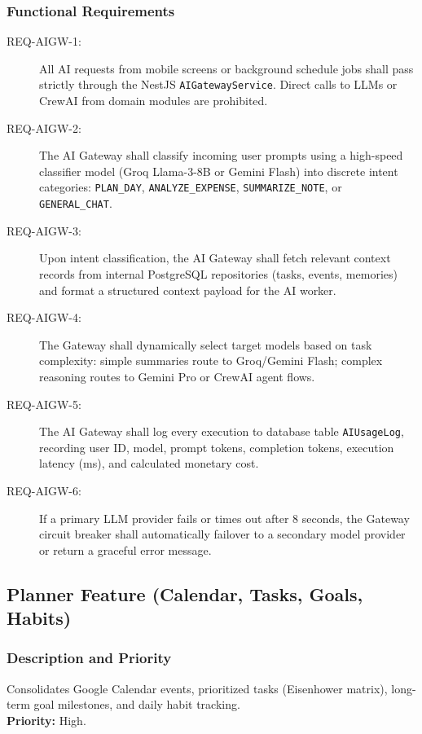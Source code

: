 \documentclass[11pt,a4paper]{article}
\begin{document}
\subsubsection{Functional Requirements}
\begin{description}
    \item[REQ-AIGW-1:] All AI requests from mobile screens or background schedule jobs shall pass strictly through the NestJS \texttt{AIGatewayService}. Direct calls to LLMs or CrewAI from domain modules are prohibited.
    \item[REQ-AIGW-2:] The AI Gateway shall classify incoming user prompts using a high-speed classifier model (Groq Llama-3-8B or Gemini Flash) into discrete intent categories: \texttt{PLAN\_DAY}, \texttt{ANALYZE\_EXPENSE}, \texttt{SUMMARIZE\_NOTE}, or \texttt{GENERAL\_CHAT}.
    \item[REQ-AIGW-3:] Upon intent classification, the AI Gateway shall fetch relevant context records from internal PostgreSQL repositories (tasks, events, memories) and format a structured context payload for the AI worker.
    \item[REQ-AIGW-4:] The Gateway shall dynamically select target models based on task complexity: simple summaries route to Groq/Gemini Flash; complex reasoning routes to Gemini Pro or CrewAI agent flows.
    \item[REQ-AIGW-5:] The AI Gateway shall log every execution to database table \texttt{AIUsageLog}, recording user ID, model, prompt tokens, completion tokens, execution latency (ms), and calculated monetary cost.
    \item[REQ-AIGW-6:] If a primary LLM provider fails or times out after 8 seconds, the Gateway circuit breaker shall automatically failover to a secondary model provider or return a graceful error message.
\end{description}

\subsection{Planner Feature (Calendar, Tasks, Goals, Habits)}
\subsubsection{Description and Priority}
Consolidates Google Calendar events, prioritized tasks (Eisenhower matrix), long-term goal milestones, and daily habit tracking. \\
\textbf{Priority:} High.
\end{document}
